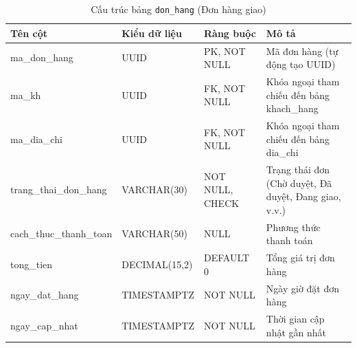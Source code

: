 \begin{table}[H]
  \centering
  \begin{tabularx}{\textwidth}{|l|l|l|>{\raggedright\arraybackslash}X|}
    \hline
    \textbf{Tên cột} & \textbf{Kiểu dữ liệu} & \textbf{Ràng buộc} & \textbf{Mô tả} \\
    \hline
    ma\_don\_hang        & UUID            & PK, NOT NULL    & Mã đơn hàng (tự động tạo UUID) \\ \hline
    ma\_kh               & UUID            & FK, NOT NULL    & Khóa ngoại tham chiếu đến bảng khach\_hang \\ \hline
    ma\_dia\_chi         & UUID            & FK, NOT NULL    & Khóa ngoại tham chiếu đến bảng dia\_chi \\ \hline
    trang\_thai\_don\_hang & VARCHAR(30)     & NOT NULL, CHECK & Trạng thái đơn (Chờ duyệt, Đã duyệt, Đang giao, v.v.) \\ \hline
    cach\_thuc\_thanh\_toan & VARCHAR(50)     & NULL            & Phương thức thanh toán \\ \hline
    tong\_tien           & DECIMAL(15,2)   & DEFAULT 0       & Tổng giá trị đơn hàng \\ \hline
    ngay\_dat\_hang      & TIMESTAMPTZ     & NOT NULL        & Ngày giờ đặt đơn hàng \\ \hline
    ngay\_cap\_nhat      & TIMESTAMPTZ     & NOT NULL        & Thời gian cập nhật gần nhất \\
    \hline
  \end{tabularx}
  \caption{Cấu trúc bảng \texttt{don\_hang} (Đơn hàng giao)}
  \label{tab:db-don-hang}
\end{table}

